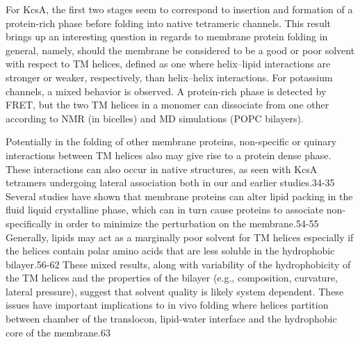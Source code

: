 For KcsA, the first two stages seem to correspond to insertion and formation of a protein-rich phase before folding into native tetrameric channels. This result brings up an interesting question in regards to membrane protein folding in general, namely, should the membrane be considered to be a good or poor solvent with respect to TM helices, defined as one where helix–lipid interactions are stronger or weaker, respectively, than helix–helix interactions. For potassium channels, a mixed behavior is observed. A protein-rich phase is detected by FRET, but the two TM helices in a monomer can dissociate from one other according to NMR (in bicelles) and MD simulations (POPC bilayers).

Potentially in the folding of other membrane proteins, non-specific or quinary interactions between TM helices also may give rise to a protein dense phase. These interactions can also occur in native structures, as seen with KcsA tetramers undergoing lateral association both in our and earlier studies.34-35 Several studies have shown that membrane proteins can alter lipid packing in the fluid liquid crystalline phase, which can in turn cause proteins to associate non-specifically in order to minimize the perturbation on the membrane.54-55 Generally, lipids may act as a marginally poor solvent for TM helices especially if the helices contain polar amino acids that are less soluble in the hydrophobic bilayer.56-62 These mixed results, along with variability of the hydrophobicity of the TM helices and the properties of the bilayer (e.g., composition, curvature, lateral pressure), suggest that solvent quality is likely system dependent. These issues have important implications to in vivo folding where helices partition between chamber of the translocon, lipid-water interface and the hydrophobic core of the membrane.63 

\renewcommand\thefigure{\thechapter.\arabic{figure}} 


